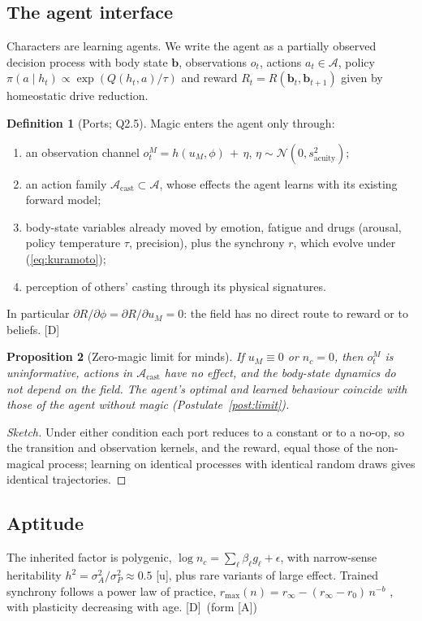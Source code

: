 \documentclass[11pt,a4paper]{article}
\numberwithin{equation}{section}
\theoremstyle{definition}
\newtheorem{definition}{Definition}[section]
\theoremstyle{plain}
\newtheorem{proposition}[definition]{Proposition}
\theoremstyle{remark}
\newcommand{\tagD}{\textcolor{tag}{\textsf{[D]}}}
\newcommand{\tagA}{\textcolor{tag}{\textsf{[A]}}}
\newcommand{\tagU}{\textcolor{tag}{\textsf{[u]}}}
\begin{document}
\subsection{The agent interface}\label{sec:agent}
Characters are learning agents. We write the agent as a partially observed decision process with body state $\bm b$, observations $o_t$, actions $a_t\in\mathcal A$, policy $\pi(a\mid h_t)\propto\exp(Q(h_t,a)/\tau)$ and reward $R_t=R(\bm b_t,\bm b_{t+1})$ given by homeostatic drive reduction.
\begin{definition}[Ports; Q2.5]\label{def:ports}
Magic enters the agent only through:
\begin{enumerate}[label=(\roman*)]
\item an observation channel $o_t^M = h(u_M,\phi)\,+\,\eta$, $\eta\sim\mathcal N(0,s_{\text{acuity}}^2)$;
\item an action family $\mathcal A_{\text{cast}}\subset\mathcal A$, whose effects the agent learns with its existing forward model;
\item body-state variables already moved by emotion, fatigue and drugs (arousal, policy temperature $\tau$, precision), plus the synchrony $r$, which evolve under (\ref{eq:kuramoto});
\item perception of others' casting through its physical signatures.
\end{enumerate}
In particular $\partial R/\partial\phi = \partial R/\partial u_M = 0$: the field has no direct route to reward or to beliefs. \tagD
\end{definition}
\begin{proposition}[Zero-magic limit for minds]\label{prop:limit}
If $u_M\equiv0$ or $n_c=0$, then $o_t^M$ is uninformative, actions in $\mathcal A_{\text{cast}}$ have no effect, and the body-state dynamics do not depend on the field. The agent's optimal and learned behaviour coincide with those of the agent without magic (Postulate~\ref{post:limit}).
\end{proposition}
\begin{proof}[Sketch]
Under either condition each port reduces to a constant or to a no-op, so the transition and observation kernels, and the reward, equal those of the non-magical process; learning on identical processes with identical random draws gives identical trajectories.
\end{proof}

\subsection{Aptitude}
The inherited factor is polygenic, $\log n_c = \sum_\ell \beta_\ell g_\ell + \epsilon$, with narrow-sense heritability $h^2=\sigma_A^2/\sigma_P^2\approx 0.5$ \tagU, plus rare variants of large effect. Trained synchrony follows a power law of practice, $r_{\max}(n)=r_\infty-(r_\infty-r_0)\,n^{-b}$ \cite{newell}, with plasticity decreasing with age. \tagD\ (form \tagA)
\end{document}
